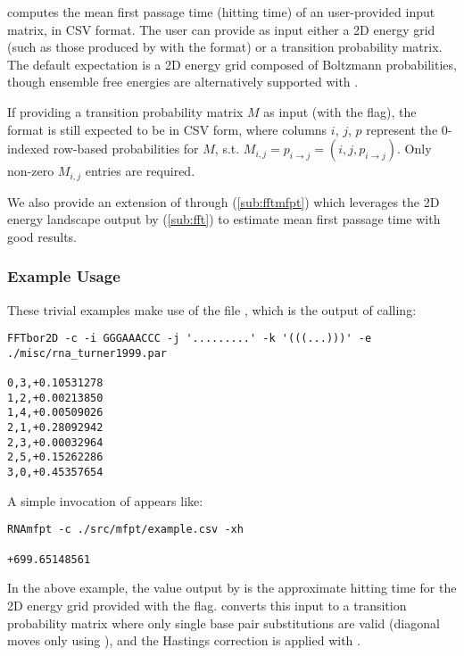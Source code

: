 \documentclass[11pt]{article}
\begin{document}
\rnamfpt computes the mean first passage time (hitting time) of an user-provided input matrix, in CSV format. The user can provide as input either a 2D energy grid (such as those produced by \fft with the  format) or a transition probability matrix. The default expectation is a 2D energy grid composed of Boltzmann probabilities, though ensemble free energies are alternatively supported with .

If providing a transition probability matrix $M$ as input (with the  flag), the format is still expected to be in CSV form, where columns $i$, $j$, $p$ represent the 0-indexed row-based probabilities for $M$, s.t. $M_{i, j} = p_{i\to j} = (i, j,p_{i\to j})$. Only non-zero $M_{i, j}$ entries are required.

We also provide an extension of \rnamfpt through \fftmfpt (\ref{sub:fftmfpt}) which leverages the 2D energy landscape output by \fft (\ref{sub:fft}) to estimate mean first passage time with good results.

\subsubsection{Example Usage} \label{subsub:rnamfptex}

These trivial examples make use of the file , which is the output of calling:

\begin{verbatim}
FFTbor2D -c -i GGGAAACCC -j '.........' -k '(((...)))' -e ./misc/rna_turner1999.par

0,3,+0.10531278
1,2,+0.00213850
1,4,+0.00509026
2,1,+0.28092942
2,3,+0.00032964
2,5,+0.15262286
3,0,+0.45357654
\end{verbatim}

\noindent A simple invocation of \rnamfpt appears like:

\begin{verbatim}
RNAmfpt -c ./src/mfpt/example.csv -xh

+699.65148561
\end{verbatim}

In the above example, the value output by \rnamfpt is the approximate hitting time for the 2D energy grid provided with the  flag. \rnamfpt converts this input to a transition probability matrix where only single base pair substitutions are valid (diagonal moves only using ), and the Hastings correction is applied with .
\end{document}

